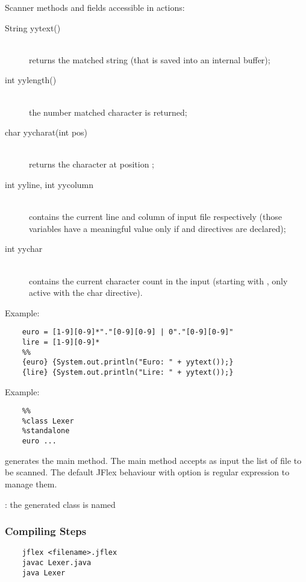 Scanner methods and fields accessible in actions:
\begin{description}
	\item[String yytext()]\mbox{} \\
	returns the matched string (that is saved into an internal buffer);
	\item[int yylength()]\mbox{} \\
	the number matched character is returned;
	\item[char yycharat(int pos)]\mbox{} \\
	returns the character at position ;
	\item[int yyline, int yycolumn]\mbox{} \\
	contains the current line and column of input file respectively (those variables have a meaningful value only if  and  directives are declared);
	\item[int yychar]\mbox{} \\
	contains the current character count in the input (starting with , only active with the \code{\%} char directive).
\end{description}
Example:
\begin{lstlisting}[frame=single]
	%%
	euro = [1-9][0-9]*"."[0-9][0-9] | 0"."[0-9][0-9]"
	lire = [1-9][0-9]*
	%%
	{euro} {System.out.println("Euro: " + yytext());}
	{lire} {System.out.println("Lire: " + yytext());}
\end{lstlisting}
Example:
\begin{lstlisting}
	%%
	%class Lexer
	%standalone
	euro ...
\end{lstlisting}
 generates the main method.
The main method accepts as input the list of file to be scanned.
The default JFlex behaviour with  option is regular expression to manage them.

: the generated class is named 

\subsubsection{Compiling Steps}
\begin{lstlisting}
	jflex <filename>.jflex
	javac Lexer.java
	java Lexer
\end{lstlisting}


